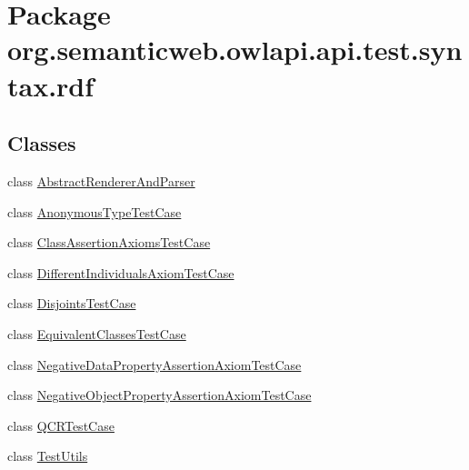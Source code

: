 \hypertarget{namespaceorg_1_1semanticweb_1_1owlapi_1_1api_1_1test_1_1syntax_1_1rdf}{\section{Package org.\-semanticweb.\-owlapi.\-api.\-test.\-syntax.\-rdf}
\label{namespaceorg_1_1semanticweb_1_1owlapi_1_1api_1_1test_1_1syntax_1_1rdf}
}
\subsection*{Classes}
\begin{DoxyCompactItemize}
\item 
class \hyperlink{classorg_1_1semanticweb_1_1owlapi_1_1api_1_1test_1_1syntax_1_1rdf_1_1_abstract_renderer_and_parser}{Abstract\-Renderer\-And\-Parser}
\item 
class \hyperlink{classorg_1_1semanticweb_1_1owlapi_1_1api_1_1test_1_1syntax_1_1rdf_1_1_anonymous_type_test_case}{Anonymous\-Type\-Test\-Case}
\item 
class \hyperlink{classorg_1_1semanticweb_1_1owlapi_1_1api_1_1test_1_1syntax_1_1rdf_1_1_class_assertion_axioms_test_case}{Class\-Assertion\-Axioms\-Test\-Case}
\item 
class \hyperlink{classorg_1_1semanticweb_1_1owlapi_1_1api_1_1test_1_1syntax_1_1rdf_1_1_different_individuals_axiom_test_case}{Different\-Individuals\-Axiom\-Test\-Case}
\item 
class \hyperlink{classorg_1_1semanticweb_1_1owlapi_1_1api_1_1test_1_1syntax_1_1rdf_1_1_disjoints_test_case}{Disjoints\-Test\-Case}
\item 
class \hyperlink{classorg_1_1semanticweb_1_1owlapi_1_1api_1_1test_1_1syntax_1_1rdf_1_1_equivalent_classes_test_case}{Equivalent\-Classes\-Test\-Case}
\item 
class \hyperlink{classorg_1_1semanticweb_1_1owlapi_1_1api_1_1test_1_1syntax_1_1rdf_1_1_negative_data_property_assertion_axiom_test_case}{Negative\-Data\-Property\-Assertion\-Axiom\-Test\-Case}
\item 
class \hyperlink{classorg_1_1semanticweb_1_1owlapi_1_1api_1_1test_1_1syntax_1_1rdf_1_1_negative_object_property_assertion_axiom_test_case}{Negative\-Object\-Property\-Assertion\-Axiom\-Test\-Case}
\item 
class \hyperlink{classorg_1_1semanticweb_1_1owlapi_1_1api_1_1test_1_1syntax_1_1rdf_1_1_q_c_r_test_case}{Q\-C\-R\-Test\-Case}
\item 
class \hyperlink{classorg_1_1semanticweb_1_1owlapi_1_1api_1_1test_1_1syntax_1_1rdf_1_1_test_utils}{Test\-Utils}
\end{DoxyCompactItemize}
